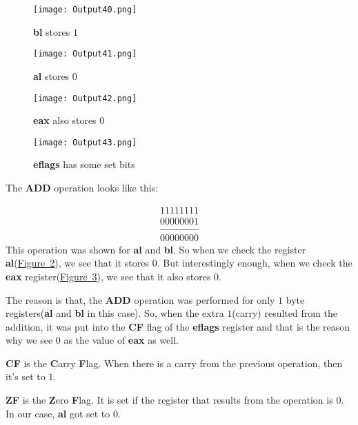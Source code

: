 \documentclass{article}
\begin{document}
\begin{figure}[h]
\centering
\texttt{[image: Output40.png]}
\caption{\textbf{bl} stores $1$}
\label{fig:fig7}
\end{figure}
\newpage
\begin{figure}[h]
\centering
\texttt{[image: Output41.png]}
\caption{\textbf{al} stores $0$}
\label{fig:fig8}
\end{figure}

\begin{figure}[h]
\centering
\texttt{[image: Output42.png]}
\caption{\textbf{eax} also stores $0$}
\label{fig:fig9}
\end{figure}

\begin{figure}[h]
\centering
\texttt{[image: Output43.png]}
\caption{\textbf{eflags} has some set bits}
\label{fig:fig10}
\end{figure}

The \textbf{ADD} operation looks like this:


\begin{align*}
11111111 \\
00000001 \\
\_\_\_\_\_\_\_\_\_\_\_\_ \\
00000000
\end{align*}
This operation was shown for \textbf{al} and \textbf{bl}. So when we check the register \textbf{al}(\hyperref[fig:fig8]{Figure~\ref{fig:fig8}}), we see that it stores $0$. But interestingly enough, when we check the \textbf{eax} register(\hyperref[fig:fig9]{Figure~\ref{fig:fig9}}), we see that it also stores $0$.

The reason is that, the \textbf{ADD} operation was performed for only $1$ byte registers(\textbf{al} and \textbf{bl} in this case). So, when the extra $1$(carry) resulted from the addition, it was put into the \textbf{CF} flag of the \textbf{eflags} register and that is the reason why we see $0$ as the value of \textbf{eax} as well.

\vspace{10pt}
\textbf{CF} is the \textbf{C}arry \textbf{F}lag. When there is a carry from the previous operation, then it's set to $1$.

\vspace{10pt}
\textbf{ZF} is the \textbf{Z}ero \textbf{F}lag. It is set if the register that results from the operation is $0$. In our case, \textbf{al} got set to $0$.
\newpage
\end{document}
